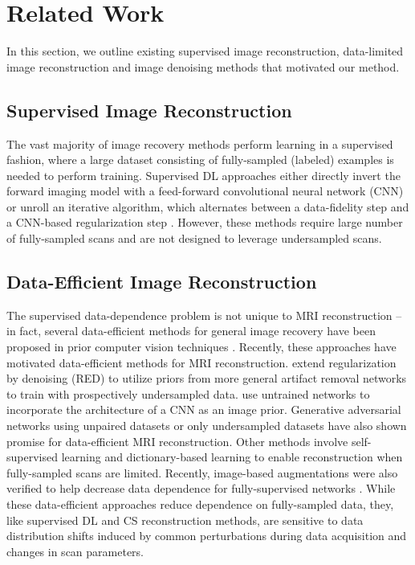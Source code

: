 \documentclass[10pt,twocolumn,letterpaper]{article}
\begin{document}
\section{Related Work}
In this section, we outline existing supervised image reconstruction, data-limited image reconstruction and image denoising methods that motivated our method.

\subsection{Supervised Image Reconstruction}
The vast majority of image recovery methods perform learning in a supervised fashion, where a large dataset consisting of fully-sampled (labeled) examples is needed to perform training. Supervised DL approaches either directly invert the forward imaging model with a feed-forward convolutional neural network (CNN) \cite{zhang2017, 2017deepcnn, akccakaya2018scan, quan2018compressed} or unroll an iterative algorithm, which alternates between a data-fidelity step and a CNN-based regularization step \cite{pezzotti2020adaptive,adler2018learned,Meinhardt_Moeller_Hazirbas_Cremers_2017,Aggarwal_Mani_Jacob_2019, hammernik2018learning, Yaman_self}. However, these methods require large number of fully-sampled scans and are not designed to leverage undersampled scans.

\subsection{Data-Efficient Image Reconstruction}
The supervised data-dependence problem is not unique to MRI reconstruction -- in fact, several data-efficient methods for general image recovery have been proposed in prior computer vision techniques \cite{lehtinen2018noise2noise, hu2021system, batson2019noise2self, hendriksen2020noise2inverse,romano2017little}. Recently, these approaches have motivated data-efficient methods for MRI reconstruction. \citet{Liu_Sun_Eldeniz_Gan_An_Kamilov_2020} extend regularization by denoising (RED) \cite{romano2017little} to utilize priors from more general artifact removal networks to train with prospectively undersampled data. \cite{darestani2021accelerated} use untrained networks to incorporate the architecture of a CNN as an image prior. Generative adversarial networks using unpaired datasets \cite{Lei_Mardani_Pauly_Vasanawala_2021} or only undersampled datasets \cite{cole2020unsupervised} have also shown promise for data-efficient MRI reconstruction. Other methods involve self-supervised learning \cite{Yaman_self, yaman2021zero, demirel202120} and dictionary-based learning \cite{Lahiri_Wang_Ravishankar_Fessler_2021,ravishankar2017efficient,song2019coupled} to enable reconstruction when fully-sampled scans are limited. Recently, image-based augmentations were also verified to help decrease data dependence for fully-supervised networks \cite{fabian2021data}. While these data-efficient approaches reduce dependence on fully-sampled data, they, like supervised DL and CS reconstruction methods, are sensitive to data distribution shifts induced by common perturbations during data acquisition and changes in scan parameters.
\end{document}
